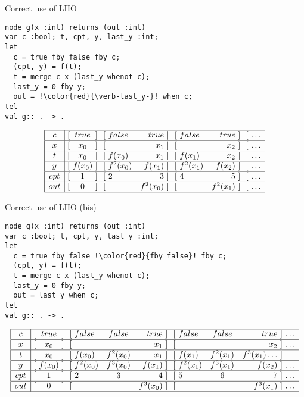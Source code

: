 \documentclass[xcolor=dvipsnames]{beamer}
\def\li{\\ \hline}
\begin{document}
\begin{frame}[fragile]{Correct use of LHO}
\begin{lstlisting}[escapechar=!]
node g(x :int) returns (out :int)
var c :bool; t, cpt, y, last_y :int;
let
  c = true fby false fby c;
  (cpt, y) = f(t);
  t = merge c x (last_y whenot c);
  last_y = 0 fby y;
  out = !\color{red}{\verb-last_y-}! when c;
tel
val g:: . -> .
\end{lstlisting}
\[
\begin{array}{|c|@{\ [\ }c@{\ ]\ }@{\ [\ }lr@{\ ]\ }@{\ [\ }lr@{\ ]\ }@{\ [\ }lr} \hline
c & true & false & true & false & true & \ldots\li
x & x_0 & & x_1 & & x_2 &\ldots\li
t & x_0 & f(x_0) & x_1 & f(x_1) & x_2 &\ldots\li 
y & f(x_0) & f^2(x_0) & f(x_1) & f^2(x_1) & f(x_2) &\ldots\li
cpt & 1 & 2 & 3 & 4 & 5 &\ldots\li
out & 0 & & f^2(x_0) & & f^2(x_1) &\ldots \li
\end{array}
\]
\end{frame}

\begin{frame}[fragile]{Correct use of LHO (bis)}
\begin{lstlisting}[escapechar=!]
node g(x :int) returns (out :int)
var c :bool; t, cpt, y, last_y :int;
let
  c = true fby false !\color{red}{fby false}! fby c;
  (cpt, y) = f(t);
  t = merge c x (last_y whenot c);
  last_y = 0 fby y;
  out = last_y when c;
tel
val g:: . -> .
\end{lstlisting}
\[
\begin{array}{|c|@{\ [\ }c@{\ ]\ }@{\ [\ }lcr@{\ ]\ }@{\ [\ }lcr@{\ ]\ }l} \hline
c & true & false & false & true & false & false & true & \ldots\li
x & x_0 & & & x_1 & & & x_2 &\ldots\li
t & x_0 & f(x_0) & f^2(x_0) & x_1 & f(x_1) & f^2(x_1) & f^3(x_1)\ldots\li 
y & f(x_0) & f^2(x_0) & f^3(x_0) & f(x_1) & f^2(x_1) & f^3(x_1) & f(x_2) &\ldots\li
cpt & 1 & 2 & 3 & 4 & 5 & 6 & 7 &\ldots\li
out & 0 & & & f^3(x_0) & & & f^3(x_1) &\ldots \li
\end{array}
\]
\end{frame}
\end{document}
